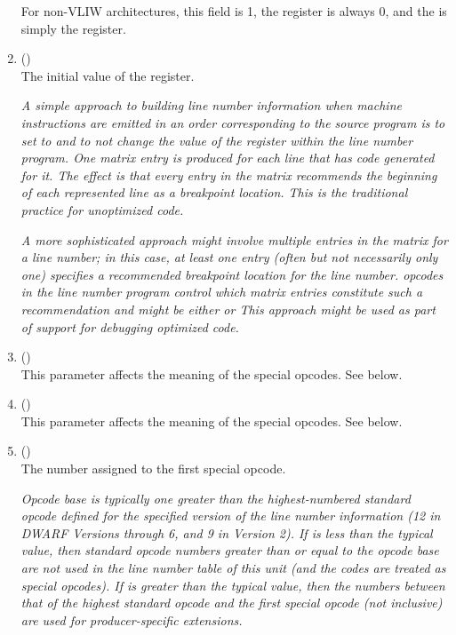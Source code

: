\begin{enumerate}[1. ]
For non-VLIW
architectures, this field is 1, the \LNSREGopindex{} register is always
0, and the  is simply the \LNSREGaddress{} register.

\item \HFNdefaultisstmt{} (\HFTubyte) \\
The initial value of the \LNSREGisstmt{} register.  

\textit{A simple approach
to building line number information when machine instructions
are emitted in an order corresponding to the source program
is to set \HFNdefaultisstmt{}
to  and to not change the
value of the \LNSREGisstmt{} register 
within the line number program.
One matrix entry is produced for each line that has code
generated for it. The effect is that every entry in the
matrix recommends the beginning of each represented line as
a breakpoint location. This is the traditional practice for
unoptimized code.}

\textit{A more sophisticated approach might involve multiple entries in
the matrix for a line number; in this case, at least one entry
(often but not necessarily only one) specifies a recommended
breakpoint location for the line number. \DWLNSnegatestmt{}
opcodes in the line number program control which matrix entries
constitute such a recommendation and 
\HFNdefaultisstmt{} might
be either  or  This approach might be
used as part of support for debugging optimized code.}

\item \HFNlinebase{} (\HFTsbyte) \\
This parameter affects the meaning of the special opcodes. See below.

\item \HFNlinerange{} (\HFTubyte) \\
This parameter affects the meaning of the special opcodes. See below.

\item \HFNopcodebase{} (\HFTubyte) \\
The number assigned to the first special opcode.

\textit{Opcode base is typically one greater than the highest-numbered
standard opcode defined for the specified version of the line
number information (12 in DWARF Versions 
 through 6,
\eb
{}
and 9 in
Version 2).  
If \HFNopcodebase{} is less than the typical value,
then standard opcode numbers greater than or equal to the
opcode base are not used in the line number table of this unit
(and the codes are treated as special opcodes). If \HFNopcodebase{}
is greater than the typical value, then the numbers between
that of the highest standard opcode and the first special
opcode (not inclusive) are used for 
\bb
producer-specific 
\eb
extensions.}


\end{enumerate}
